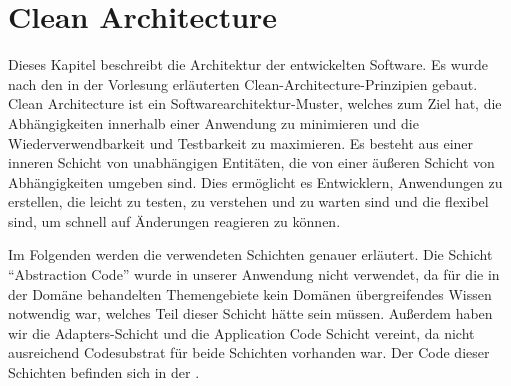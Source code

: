 \chapter{Clean Architecture}\label{CA}

Dieses Kapitel beschreibt die Architektur der entwickelten Software. Es wurde nach den in der Vorlesung erläuterten Clean-Architecture-Prinzipien gebaut. Clean Architecture ist ein Softwarearchitektur-Muster, welches zum Ziel hat, die Abhängigkeiten innerhalb einer Anwendung zu minimieren und die Wiederverwendbarkeit und Testbarkeit zu maximieren. Es besteht aus einer inneren Schicht von unabhängigen Entitäten, die von einer äußeren Schicht von Abhängigkeiten umgeben sind. Dies ermöglicht es Entwicklern, Anwendungen zu erstellen, die leicht zu testen, zu verstehen und zu warten sind und die flexibel sind, um schnell auf Änderungen reagieren zu können.

Im Folgenden werden die verwendeten Schichten genauer erläutert. Die Schicht \enquote{Abstraction Code} wurde in unserer Anwendung nicht verwendet, da für die in der Domäne behandelten Themengebiete kein Domänen übergreifendes Wissen notwendig war, welches Teil dieser Schicht hätte sein müssen. 
Außerdem haben wir die Adapters-Schicht und die Application Code Schicht vereint, da nicht ausreichend Codesubstrat für beide Schichten vorhanden war. Der Code dieser Schichten befinden sich in der \href{https://github.com/MichaelaHaag/RezeptApp/tree/main/1-Adapter}{}.

